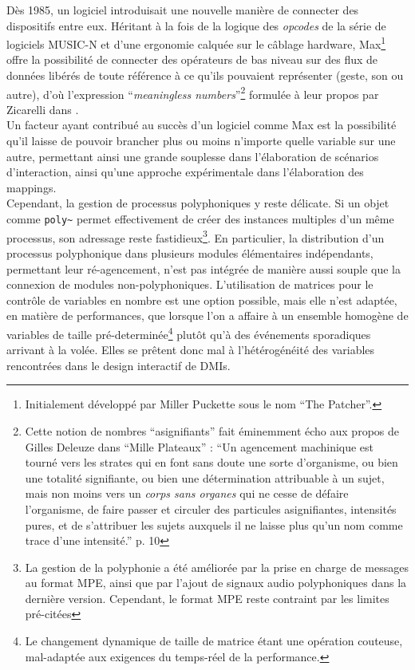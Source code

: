 \noindent Dès 1985, un logiciel introduisait une nouvelle manière de connecter des dispositifs entre eux. Héritant à la fois de la logique des \textit{opcodes} de la série de logiciels \gls{MUSIC-N} et d'une ergonomie calquée sur le câblage hardware, Max\footnote{Initialement développé par Miller Puckette sous le nom ``The Patcher''.} offre la possibilité de connecter des opérateurs de bas niveau sur des flux de données libérés de toute référence à ce qu'ils pouvaient représenter (geste, son ou autre), d'où l'expression ``\textit{meaningless numbers}''\footnote{Cette notion de nombres ``asignifiants'' fait éminemment écho aux propos de Gilles Deleuze dans ``Mille Plateaux'' \cite{deleuze_mille_1980} : ``Un agencement machinique est tourné vers les strates qui en font sans doute une sorte d'organisme, ou bien une totalité signifiante, ou bien une détermination attribuable à un sujet, mais non moins vers un \textit{corps sans organes} qui ne cesse de défaire l'organisme, de faire passer et circuler des particules asignifiantes, intensités pures, et de s'attribuer les sujets auxquels il ne laisse plus qu'un nom comme trace d'une intensité.'' p. 10} formulée à leur propos par Zicarelli dans \cite{zicarelli_communicating_1991}.\\
\indent Un facteur ayant contribué au succès d'un logiciel comme Max est la possibilité qu'il laisse de pouvoir brancher plus ou moins n'importe quelle variable sur une autre, permettant ainsi une grande souplesse dans l'élaboration de scénarios d'interaction, ainsi qu'une approche expérimentale dans l'élaboration des \glspl{mapping}.\\
\indent Cependant, la gestion de processus polyphoniques y reste délicate. Si un objet comme \verb|poly~| permet effectivement de créer des instances multiples d'un même processus, son adressage reste fastidieux\footnote{La gestion de la polyphonie a été améliorée par la prise en charge de messages au format \gls{MPE}, ainsi que par l'ajout de signaux audio polyphoniques dans la dernière version. Cependant, le format \gls{MPE} reste contraint par les limites pré-citées}. En particulier, la distribution d'un processus polyphonique dans plusieurs modules élémentaires indépendants, permettant leur ré-agencement, n'est pas intégrée de manière aussi souple que la connexion de modules non-polyphoniques. L'utilisation de matrices pour le contrôle de variables en nombre est une option possible, mais elle n'est adaptée, en matière de performances, que lorsque l'on a affaire à un ensemble homogène de variables de taille pré-determinée\footnote{Le changement dynamique de taille de matrice étant une opération couteuse, mal-adaptée aux exigences du temps-réel de la performance.} plutôt qu'à des événements sporadiques arrivant à la volée. Elles se prêtent donc mal à l'hétérogénéité des variables rencontrées dans le design interactif de \glspl{DMI}.

